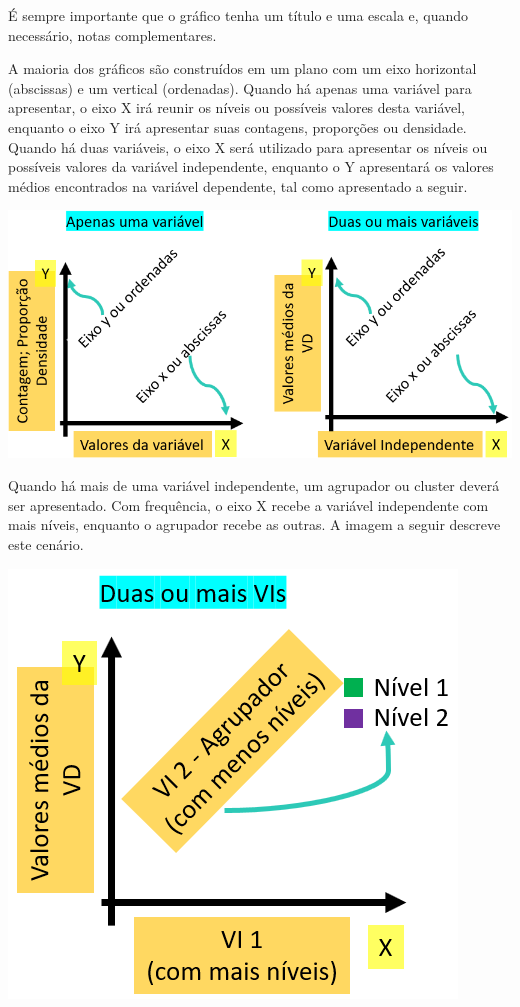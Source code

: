 \documentclass[
]{book}
\begin{document}
É sempre importante que o gráfico tenha um título e uma escala e, quando necessário, notas complementares.

A maioria dos gráficos são construídos em um plano com um eixo horizontal (abscissas) e um vertical (ordenadas). Quando há apenas uma variável para apresentar, o eixo X irá reunir os níveis ou possíveis valores desta variável, enquanto o eixo Y irá apresentar suas contagens, proporções ou densidade. Quando há duas variáveis, o eixo X será utilizado para apresentar os níveis ou possíveis valores da variável independente, enquanto o Y apresentará os valores médios encontrados na variável dependente, tal como apresentado a seguir.

\includegraphics{./img/cap_grafico_tutorial.png}

Quando há mais de uma variável independente, um agrupador ou cluster deverá ser apresentado. Com frequência, o eixo X recebe a variável independente com mais níveis, enquanto o agrupador recebe as outras. A imagem a seguir descreve este cenário.

\includegraphics{./img/cap_grafico_tutorial2.png}
\end{document}
